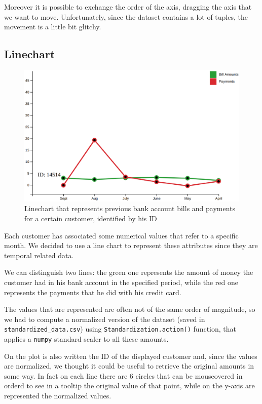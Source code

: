 \documentclass[journal]{vgtc}                %
\begin{document}
Moreover it is possible to exchange the order of the axis, dragging the axis that we want to move. Unfortunately, since the dataset contains a lot of tuples, the movement is a little bit glitchy.


\subsection{Linechart}

\begin{figure}[h]
  \centering
  \includegraphics[scale=0.15]{linechart}
  \caption{Linechart that represents previous bank account bills and payments for a certain customer, identified by his ID}
  \label{linechart}
\end{figure}

Each customer has associated some numerical values that refer to a specific month. We decided to use a line chart to represent these attributes since they are temporal related data.

We can distinguish two lines: the green one represents the amount of money the customer had in his bank account in the specified period, while the red one represents the payments that he did
with his credit card.

The values that are represented are often not of the same order of magnitude, so we had to compute a normalized version of the dataset (saved in \texttt{standardized\_data.csv}) using \texttt{Standardization.action()} function, that applies
a \texttt{numpy} standard scaler to all these amounts.

On the plot is also written the ID of the displayed customer and, since the values are normalized, we thought it could be useful to retrieve the original amounts in some way. In fact on each line there are 6 circles that can be mouseovered in orderd to see in a tooltip
the original value of that point, while on the y-axis are represented the normalized values.
\end{document}
